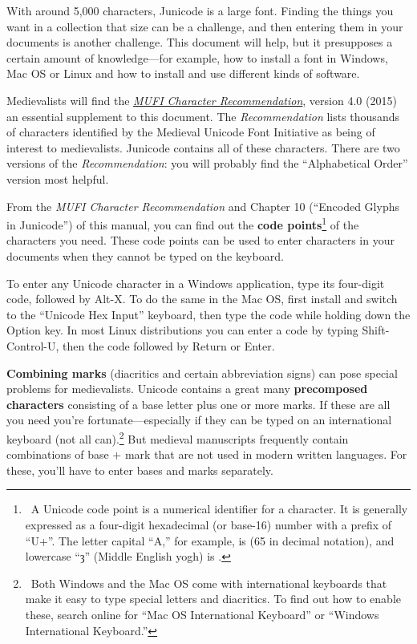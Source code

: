With around 5,000 characters, Junicode is a large font. Finding the things you
want in a collection that size can be a challenge, and then entering them in your
documents is another challenge. This document will help, but it
presupposes a certain amount of knowledge—for example, how to install a font in
Windows, Mac OS or Linux and how to install and use different kinds of software.

Medievalists will find the \href{https://bora.uib.no/bora-xmlui/handle/1956/10699}%
{\textit{MUFI Character Recommendation}}, version 4.0 (2015)
an essential supplement to this document. The \textit{Recommendation} lists
thousands of characters identified by the
Medieval Unicode Font Initiative as being of interest to medievalists. Junicode
contains all of these characters. There are two versions of the \textit{Recommendation}:
you will probably find the “Alphabetical Order” version most helpful.

From the \textit{MUFI Character Recommendation} and Chapter 10 (“Encoded Glyphs in
Junicode”) of this manual, you can find out
the \textbf{code points}\footnote{\ A Unicode code point is a numerical identifier for a character.
It is generally expressed as a
four-digit hexadecimal (or base-16) number with a prefix of ``U+''. The letter
capital ``A,'' for example, is  (65
in decimal notation), and lowercase ``ȝ'' (Middle English yogh) is .}
of the characters you need. These code points can be used to enter
characters in your documents when they cannot be typed on the keyboard.

To enter any Unicode character in a Windows application, type its four-digit
code, followed by Alt-X. To do the same in the Mac OS, first install and switch
to the “Unicode Hex Input” keyboard, then type the code while holding down the Option
key. In most Linux distributions you can enter a code by typing Shift-Control-U,
then the code followed by Return or Enter.

\textbf{Combining marks} (diacritics and certain abbreviation signs) can pose special problems for
medievalists. Unicode contains a great
many \textbf{precomposed characters} consisting of a base letter plus one or more marks.
If these are all you need you're fortunate---especially if they can be
typed on an international keyboard (not all can).\footnote{\ Both
Windows and the Mac OS come with international keyboards that make it easy to
type special letters and diacritics. To find out how to enable these, search
online for “Mac OS International Keyboard” or “Windows International Keyboard.”}
But medieval manuscripts frequently contain
combinations of base + mark that are not used in modern written languages.
For these, you'll have to
enter bases and marks separately.

